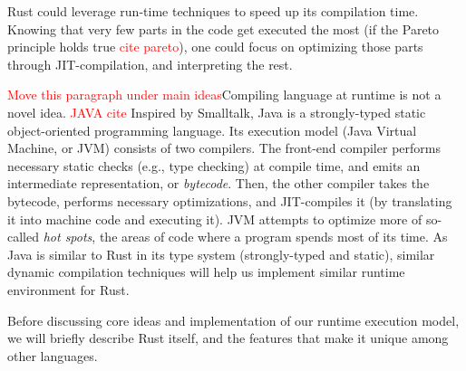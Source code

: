 Rust could leverage run-time techniques to speed up its compilation time.
Knowing that very few parts in the code get executed the most (if the Pareto
principle holds true \textcolor{red}{cite pareto}), one could
focus on optimizing those parts through JIT-compilation, and interpreting the
rest.

\textcolor{red}{Move this paragraph under main ideas}Compiling language at runtime is not a novel idea.
\textcolor{red}{JAVA cite} Inspired by Smalltalk, Java
is a strongly-typed static object-oriented programming language.
Its execution model (Java Virtual Machine, or JVM) consists of two compilers.
The front-end compiler performs necessary static checks (e.g., type checking)
at compile time, and emits an intermediate representation, or \textit{bytecode}.
Then, the other compiler takes the bytecode, performs necessary optimizations,
and JIT-compiles it (by translating it into machine code and executing
it). JVM attempts to optimize more of so-called \textit{hot spots}, the areas
of code where a program spends most of its time. As Java is similar to Rust
in its type system (strongly-typed and static), similar dynamic compilation 
techniques will help us implement similar runtime environment for Rust.

Before discussing core ideas and implementation of our runtime
execution model, we will briefly describe Rust itself, and the features
that make it unique among other languages.

